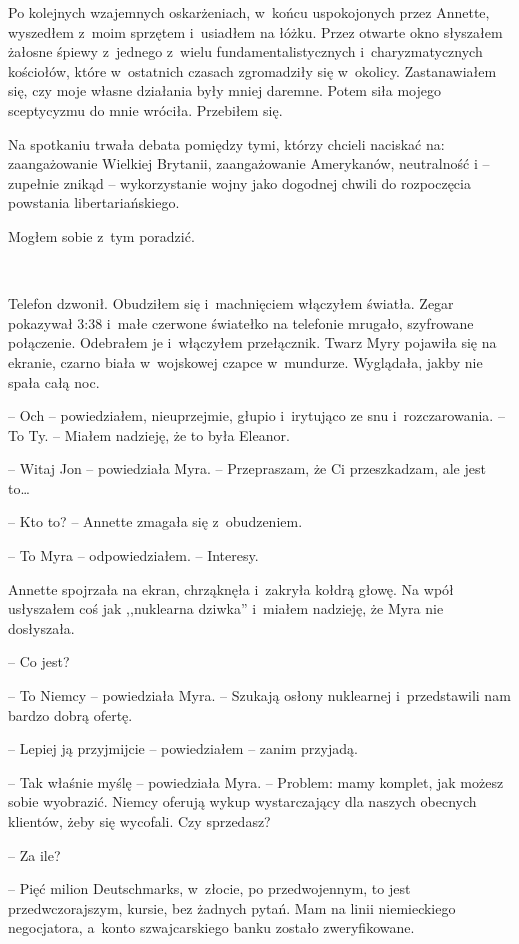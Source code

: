 \documentclass[oneside,polish,11pt,sfheadings]{mwbk}
\begin{document}
Po kolejnych wzajemnych oskarżeniach, w~końcu uspokojonych przez
Annette, wyszedłem z~moim sprzętem i~usiadłem na łóżku. Przez otwarte
okno słyszałem żałosne śpiewy z~jednego z~wielu fundamentalistycznych i~charyzmatycznych kościołów, które w~ostatnich czasach zgromadziły się w~okolicy. Zastanawiałem się, czy moje własne działania były mniej
daremne. Potem siła mojego sceptycyzmu do mnie wróciła. Przebiłem się.

Na spotkaniu trwała debata pomiędzy tymi, którzy chcieli naciskać na:
zaangażowanie Wielkiej Brytanii, zaangażowanie Amerykanów, neutralność i -- zupełnie znikąd -- wykorzystanie wojny jako dogodnej chwili do
rozpoczęcia powstania libertariańskiego.

Mogłem sobie z~tym poradzić.

~

Telefon dzwonił. Obudziłem się i~machnięciem włączyłem światła. Zegar
pokazywał 3:38 i~małe czerwone światełko na telefonie mrugało,
szyfrowane połączenie. Odebrałem je i~włączyłem przełącznik. Twarz Myry
pojawiła się na ekranie, czarno biała w~wojskowej czapce w~mundurze.
Wyglądała, jakby nie spała całą noc.

-- Och -- powiedziałem, nieuprzejmie, głupio i~irytująco ze snu i~rozczarowania. -- To Ty. -- Miałem nadzieję, że to była Eleanor.

-- Witaj Jon -- powiedziała Myra. -- Przepraszam, że Ci przeszkadzam, ale
jest to\ldots

-- Kto to? -- Annette zmagała się z~obudzeniem.

-- To Myra -- odpowiedziałem. -- Interesy.

Annette spojrzała na ekran, chrząknęła i~zakryła kołdrą głowę. Na wpół
usłyszałem coś jak ,,nuklearna dziwka'' i~miałem nadzieję, że Myra nie
dosłyszała.

-- Co jest?

-- To Niemcy -- powiedziała Myra. -- Szukają osłony nuklearnej i~przedstawili nam bardzo dobrą ofertę.

-- Lepiej ją przyjmijcie -- powiedziałem -- zanim przyjadą.

-- Tak właśnie myślę -- powiedziała Myra. -- Problem: mamy komplet, jak
możesz sobie wyobrazić. Niemcy oferują wykup wystarczający dla naszych
obecnych klientów, żeby się wycofali. Czy sprzedasz?

-- Za ile?

-- Pięć milion Deutschmarks, w~złocie, po przedwojennym, to jest
przedwczorajszym, kursie, bez żadnych pytań. Mam na linii niemieckiego
negocjatora, a~konto szwajcarskiego banku zostało zweryfikowane.
\end{document}
